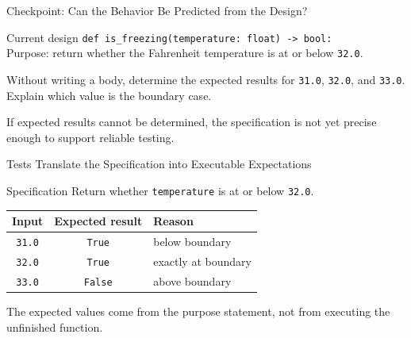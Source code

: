 \documentclass[aspectratio=169,10pt]{beamer}
\begin{document}
\begin{frame}{Checkpoint: Can the Behavior Be Predicted from the Design?}
  \begin{block}{Current design}
    \texttt{def is\_freezing(temperature: float) -> bool:}\\[0.08in]
    Purpose: return whether the Fahrenheit temperature is at or below \texttt{32.0}.
  \end{block}

  \begin{activity}
    Without writing a body, determine the expected results for \texttt{31.0}, \texttt{32.0}, and \texttt{33.0}. Explain which value is the boundary case.
  \end{activity}

  \begin{keyidea}
    If expected results cannot be determined, the specification is not yet precise enough to support reliable testing.
  \end{keyidea}
\end{frame}


\begin{frame}{Tests Translate the Specification into Executable Expectations}
  \begin{block}{Specification}
    Return whether \texttt{temperature} is at or below \texttt{32.0}.
  \end{block}

  \begin{center}
    \renewcommand{\arraystretch}{1.4}
    \begin{tabular}{c|c|l}
      \textbf{Input} & \textbf{Expected result} & \textbf{Reason} \\\hline
      \texttt{31.0} & \texttt{True} & below boundary \\
      \texttt{32.0} & \texttt{True} & exactly at boundary \\
      \texttt{33.0} & \texttt{False} & above boundary
    \end{tabular}
  \end{center}

  \begin{keyidea}
    The expected values come from the purpose statement, not from executing the unfinished function.
  \end{keyidea}
\end{frame}
\end{document}
